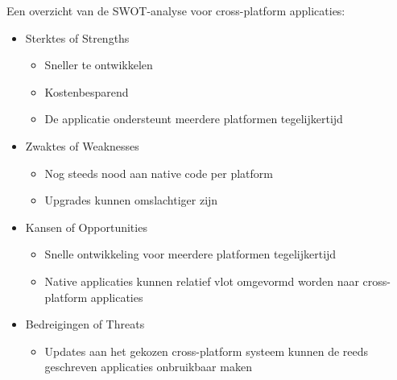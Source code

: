Een overzicht van de SWOT-analyse voor cross-platform applicaties:
\begin{itemize}
    \item Sterktes of Strengths
    \begin{itemize}
        \item Sneller te ontwikkelen
        \item Kostenbesparend
        \item De applicatie ondersteunt meerdere platformen tegelijkertijd
    \end{itemize}
    \item Zwaktes of Weaknesses
    \begin{itemize}
        \item Nog steeds nood aan native code per platform
        \item Upgrades kunnen omslachtiger zijn
    \end{itemize}
    \item Kansen of Opportunities
    \begin{itemize}
        \item Snelle ontwikkeling voor meerdere platformen tegelijkertijd
        \item Native applicaties kunnen relatief vlot omgevormd worden naar cross-platform applicaties
    \end{itemize}
    \item Bedreigingen of Threats
    \begin{itemize}
        \item Updates aan het gekozen cross-platform systeem kunnen de reeds geschreven applicaties onbruikbaar maken
    \end{itemize}
\end{itemize}

